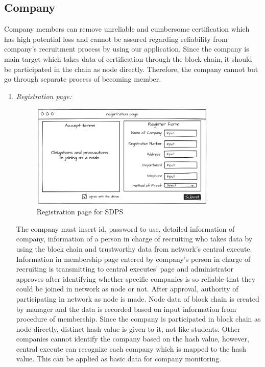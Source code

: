 \documentclass[conference]{IEEEtran}
\begin{document}
\subsection{Company}
Company members can remove unreliable and cumbersome certification which has high potential loss and cannot be assured regarding reliability from company’s recruitment process by using our application. Since the company is main target which takes data of certification through the block chain, it should be participated in the chain as node directly. Therefore, the company cannot but go through separate process of becoming member.\\
 \vspace{100mm}
\begin{enumerate}
	\item \textit {Registration page: }
	\begin{figure}[htbp]
	\centerline{\includegraphics[width=89mm,scale=0.5]{company/register_page.png}}
	\caption{Registration page for SDPS}
	\label{fig}
	\end{figure}
	
	The company must insert id, password to use, detailed information of company, information of a person in charge of recruiting who takes data by using the block chain and trustworthy data from network’s central execute. Information in membership page entered by company’s person in charge of recruiting is transmitting to central executes’ page and administrator approves after identifying whether specific companies is so reliable that they could be joined in network as node or not. After approval, authority of participating in network as node is made. Node data of block chain is created by manager and the data is recorded based on input information from procedure of membership. Since the company is participated in block chain as node directly, distinct hash value is given to it, not like students. Other companies cannot identify the company based on the hash value, however, central execute can recognize each company which is mapped to the hash value. This can be applied as basic data for company monitoring.\\
    

\end{enumerate}
\end{document}

